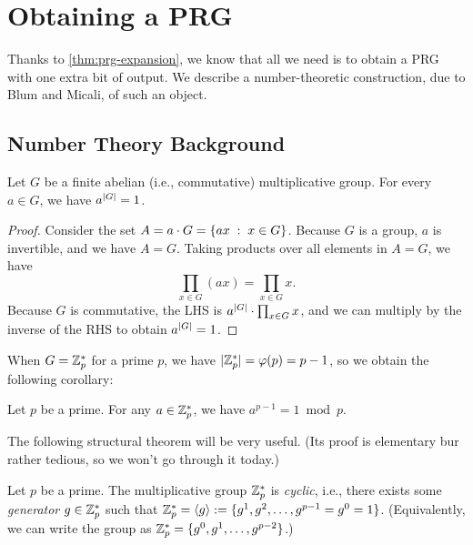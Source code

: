 \documentclass[11pt]{article}
\begin{document}
\section{Obtaining a PRG}
\label{sec:obtaining-prg}

Thanks to \cref{thm:prg-expansion}, we know that all we need is
to obtain a PRG with one extra bit of output.  We describe a
number-theoretic construction, due to Blum and Micali, of such an
object.

\subsection{Number Theory Background}
\label{sec:background}

\begin{theorem}
  \label{thm:euler-thm}
  Let $G$ be a finite abelian (i.e., commutative) multiplicative
  group.  For every $a \in G$, we have $a^{\lvert G\rvert} = 1$.
\end{theorem}

\begin{proof}
  Consider the set $A = a \cdot G = \{ ax\; :\; x \in G\}$.  Because
  $G$ is a group, $a$ is invertible, and we have $A = G$.  Taking
  products over all elements in $A = G$, we have \[ \prod_{x \in G}
  (ax) = \prod_{x \in G} x. \] Because $G$ is commutative, the LHS is
  $a^{\lvert G\rvert} \cdot \prod_{x \in G} x$, and we can multiply by the
  inverse of the RHS to obtain $a^{\lvert G\rvert} = 1$.
\end{proof}


When $G = \mathbb{Z}_p^{*}$ for a prime $p$, we have $\lvert\mathbb{Z}_p^{*}\rvert =
\varphi(p) = p-1$, so we obtain the following corollary:

\begin{corollary}
  Let $p$ be a prime.  For any $a \in \mathbb{Z}_p^{*}$, we have $a^{p-1} = 1
  \bmod p$.
\end{corollary}

The following structural theorem will be very useful.  (Its proof is
elementary bur rather tedious, so we won't go through it today.)

\begin{theorem}
  \label{thm:Zps-cyclic}
  Let $p$ be a prime.  The multiplicative group $\mathbb{Z}_p^{*}$ is
  \emph{cyclic}, i.e., there exists some \emph{generator}
  $g \in \mathbb{Z}_p^{*}$ such that
  $\mathbb{Z}_p^{*} = \langle g \rangle := \{g^{1}, g^{2}, \ldots,
    g^{p-1}=g^{0}=1\}$. (Equivalently, we can write the group as
  $\mathbb{Z}_p^{*} = \{g^{0}, g^{1}, \ldots, g^{p-2}\}$.)
\end{theorem}
\end{document}
